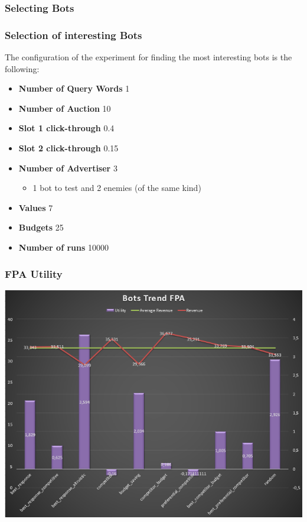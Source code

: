 \documentclass{beamer}
\begin{document}
\subsubsection{Selecting Bots}
\begin{frame}
\frametitle{Selection of interesting Bots}
The configuration of the experiment for finding the most interesting bots is the following:
\begin{itemize}
\item \textbf{Number of Query Words} 1
\item \textbf{Number of Auction} 10
\item \textbf{Slot 1 click-through } 0.4
\item \textbf{Slot 2 click-through } 0.15
\item \textbf{Number of Advertiser} 3
\begin{itemize}
\item 1 bot to test and 2 enemies (of the same kind)
\end{itemize}
\item \textbf{Values} 7
\item \textbf{Budgets}  25
\item \textbf{Number of runs } 10000
\end{itemize}
\end{frame}

\begin{frame}
\frametitle{FPA Utility}
\begin{center}\includegraphics[scale=0.46]{img/Auctions/FPA_all_Utility.PNG} 
\end{center}
\end{frame}
\end{document}
